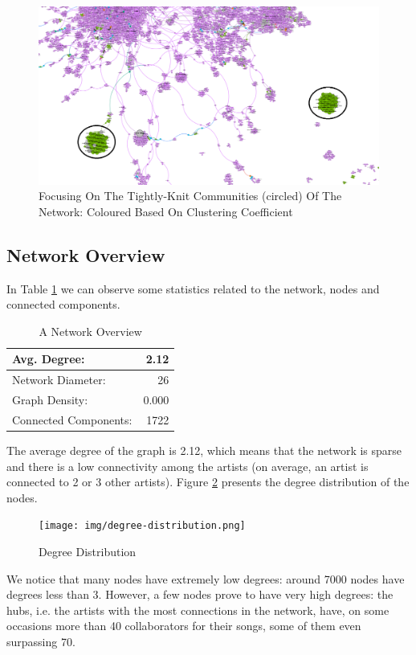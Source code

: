 \documentclass[sigchi]{acmart}
\begin{document}
\begin{figure}[h]
  \centering
  \includegraphics[width=\linewidth]{img/focus.png}
  \caption{Focusing On The Tightly-Knit Communities (circled) Of The Network: Coloured Based On Clustering Coefficient}
  \label{fig:focus}
\end{figure}

\subsection{Network Overview}
In Table \ref{tab:metrics} we can observe some statistics related to the network, nodes and connected components.

\begin{table}[h!]
  \caption{A Network Overview}
  \label{tab:metrics}
  \begin{tabular}{| l | r |}
    \hline
    Avg. Degree: &         2.12 \\
    \hline
    Network Diameter: &       26 \\
    \hline
    Graph Density: &       0.000 \\
    \hline
     Connected Components: &      1722 \\
    \hline
\end{tabular}
\end{table}

The average degree of the graph is 2.12, which means that the network is sparse and there is a low connectivity among the artists (on average, an artist is connected to 2 or 3 other artists). Figure \ref{fig:degree-distribution} presents the degree distribution of the nodes.

\begin{figure}[h]
  \centering
  \texttt{[image: img/degree-distribution.png]}
  \caption{Degree Distribution}
  \label{fig:degree-distribution}
\end{figure}
We notice that many nodes have extremely low degrees: around 7000 nodes have degrees less than 3. However, a few nodes prove to have very high degrees: the hubs, i.e. the artists with the most connections in the network, have, on some occasions more than 40 collaborators for their songs, some of them even surpassing 70.
\end{document}
